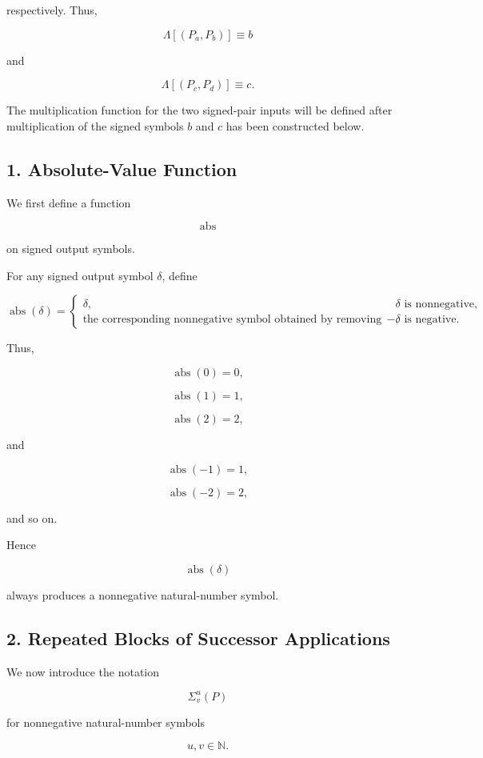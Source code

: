 \documentclass[12pt]{article}
\begin{document}
respectively. Thus,

\[
\Lambda[(P_a,P_b)]\equiv b
\]

and

\[
\Lambda[(P_c,P_d)]\equiv c.
\]

The multiplication function for the two signed-pair inputs will be defined after multiplication of the signed symbols \(b\) and \(c\) has been constructed below.

\subsection*{1. Absolute-Value Function}

We first define a function

\[
\operatorname{abs}
\]

on signed output symbols.

For any signed output symbol \(\delta\), define

\[
\boxed{
\operatorname{abs}(\delta)
=
\begin{cases}
\delta,
&
\delta\text{ is nonnegative},
\\[6pt]
\text{the corresponding nonnegative symbol obtained by removing the sign }-,
&
\delta\text{ is negative}.
\end{cases}
}
\]

Thus,

\[
\operatorname{abs}(0)=0,
\]

\[
\operatorname{abs}(1)=1,
\]

\[
\operatorname{abs}(2)=2,
\]

and

\[
\operatorname{abs}(-1)=1,
\]

\[
\operatorname{abs}(-2)=2,
\]

and so on.

Hence

\[
\operatorname{abs}(\delta)
\]

always produces a nonnegative natural-number symbol.

\subsection*{2. Repeated Blocks of Successor Applications}

We now introduce the notation

\[
\Sigma^u_v(P)
\]

for nonnegative natural-number symbols

\[
u,v\in\mathbb N.
\]
\end{document}
